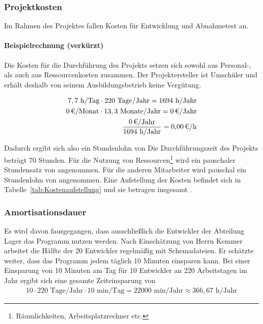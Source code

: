 \subsubsection{Projektkosten}
\label{sec:Projektkosten}
Im Rahmen des Projektes fallen Kosten für Entwicklung und Abnahmetest an.

\paragraph{Beispielrechnung (verkürzt)}
Die Kosten für die Durchführung des Projekts setzen sich sowohl aus Personal-, als auch aus Ressourcenkosten zusammen.
Der Projektersteller ist Umschüler und erhält deshalb von seinem Ausbildungsbetrieb keine Vergütung.

\begin{eqnarray}
7,7 \mbox{ h/Tag} \cdot 220 \mbox{ Tage/Jahr} = 1694 \mbox{ h/Jahr}\\
\eur{0}\mbox{/Monat} \cdot 13,3 \mbox{ Monate/Jahr} = \eur{0} \mbox{/Jahr}\\
\frac{\eur{0} \mbox{/Jahr}}{1694 \mbox{ h/Jahr}} = \eur{0,00}\mbox{/h}
\end{eqnarray}

Dadurch ergibt sich also ein Stundenlohn von 
Die Durchführungszeit des Projekts beträgt 70 Stunden. Für die Nutzung von Ressourcen\footnote{Räumlichkeiten, Arbeitsplatzrechner etc.} wird 
ein pauschaler Stundensatz von  angenommen. Für die anderen Mitarbeiter wird pauschal ein Stundenlohn von  angenommen. 
Eine Aufstellung der Kosten befindet sich in Tabelle~\ref{tab:Kostenaufstellung} und sie betragen insgesamt .


\subsubsection{Amortisationsdauer}
\label{sec:Amortisationsdauer}
Es wird davon fausgegangen, dass ausschließlich die Entwickler der Abteilung Lager das Programm nutzen werden. Nach Einschätzung von Herrn Kemmer arbeitet die Hälfte der 20 Entwickler regelmäßig mit Schemadateien. Er schätzte weiter, dass das Programm jedem täglich 10 Minuten einsparen kann.
Bei einer Einsparung von 10 Minuten am Tag für 10 Entwickler an 220 Arbeitstagen im Jahr ergibt sich eine gesamte Zeiteinsparung von 
\begin{eqnarray}
10 \cdot 220 \mbox{ Tage/Jahr} \cdot 10 \mbox{ min/Tag} = 22000 \mbox{ min/Jahr} \approx 366,67 \mbox{ h/Jahr} 
\end{eqnarray}

